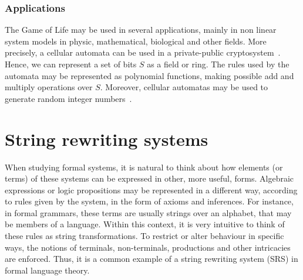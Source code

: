 \documentclass[12pt]{article}
\begin{document}

\subsubsection{Applications}

The Game of Life may be used in several applications, mainly in non linear system models in physic, mathematical, biological and other fields. More precisely, a cellular automata can be used in a private-public cryptosystem~\cite{Guan:article:1987:feb}. Hence, we can represent a set of bits $S$ as a field or ring. The rules used by the automata may be represented as polynomial functions, making possible add and multiply operations over $S$. Moreover, cellular automatas may be used to generate random integer numbers~\cite{Wolfram:article:1986:jun}.


\section{String rewriting systems}\label{sec:srs}

When studying formal systems, it is natural to think about how elements (or terms) of these systems can be expressed in other, more useful, forms. Algebraic expressions or logic propositions may be represented in a different way, according to rules given by the system, in the form of axioms and inferences. For instance, in formal grammars, these terms are usually strings over an alphabet, that may be members of a language. Within this context, it is very intuitive to think of these rules as string transformations. To restrict or alter behaviour in specific ways, the notions of terminals, non-terminals, productions and other intricacies are enforced. Thus, it is a common example of a string rewriting system (SRS) in formal language theory.
\end{document}
